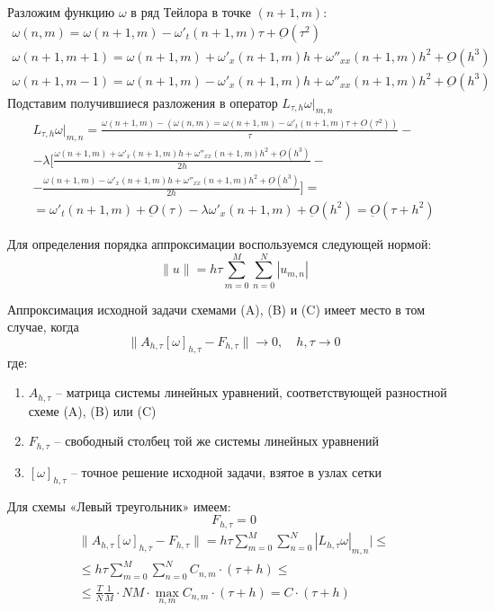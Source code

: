 \documentclass[titlepage]{article}
\def\le{\leqslant}
\begin{document}
Разложим функцию $\omega$ в ряд Тейлора в точке $(n+1,m)$:
\begin{gather*}
	\omega(n,m) = \omega(n+1,m) - \omega'_t(n+1,m)\tau + \underbar{\textit{O}}(\tau^2) \\
	\omega(n+1,m+1) = \omega(n+1,m) + \omega'_x(n+1,m)h + \omega''_{xx}(n+1,m)h^2 + \underbar{\textit{O}}(h^3) \\
	\omega(n+1,m-1) = \omega(n+1,m) - \omega'_x(n+1,m)h + \omega''_{xx}(n+1,m)h^2 + \underbar{\textit{O}}(h^3)
\end{gather*}
Подставим получившиеся разложения в оператор $L_{\tau,h}{\omega} |_{m,n}$
\begin{multline*}
	L_{\tau,h}{\omega} |_{m,n} = \frac{\omega(n+1,m) - (\omega(n,m) = \omega(n+1,m) - \omega'_t(n+1,m)\tau + \underbar{\textit{O}}(\tau^2))}{\tau} - \\
	- \lambda \biggl[ \frac{\omega(n+1,m) + \omega'_x(n+1,m)h + \omega''_{xx}(n+1,m)h^2 + \underbar{\textit{O}}(h^3)}{2h} - \\
	- \frac{\omega(n+1,m) - \omega'_x(n+1,m)h + \omega''_{xx}(n+1,m)h^2 + \underbar{\textit{O}}(h^3)}{2h} \biggr] = \\
	= \omega'_t(n+1,m) + \underbar{\textit{O}}(\tau) - \lambda\omega'_x(n+1,m) + \underbar{\textit{O}}(h^2) = \underbar{\textit{O}}(\tau + h^2)
\end{multline*}

Для определения порядка аппроксимации воспользуемся следующей нормой:
\begin{equation*}
	\|u\| = h\tau\sum_{m=0}^{M}\sum_{n=0}^{N}{|u_{m,n}|}
\end{equation*}

Аппроксимация исходной задачи схемами (A), (B) и (C) имеет место в том случае, когда 
\begin{equation*}
	\|A_{h,\tau}[\omega]_{h,\tau} - F_{h,\tau}\| \to 0, \quad h,\tau \to 0
\end{equation*}
где:
\begin{enumerate}
	\item $A_{h,\tau}$ -- матрица системы линейных уравнений, соответствующей разностной схеме (A), (B) или (C)
	\item $F_{h,\tau}$ -- свободный столбец той же системы линейных уравнений
	\item $[\omega]_{h,\tau}$ -- точное решение исходной задачи, взятое в узлах сетки
\end{enumerate}

Для схемы «Левый треугольник» имеем:
$$F_{h,\tau} = 0$$
\begin{multline*}
	\|A_{h,\tau}[\omega]_{h,\tau} - F_{h,\tau}\| = h\tau\sum_{m=0}^{M}\sum_{n=0}^{N}{|L_{h,\tau}\omega|_{m,n}|} \le \\
	\le h\tau\sum_{m=0}^{M}\sum_{n=0}^{N}{C_{n,m}\cdot(\tau+h)} \le \\
	\le \frac{T}{N}\frac{1}{M} \cdot NM \cdot \max_{n,m}{C_{n,m}} \cdot (\tau+h) = C \cdot (\tau+h)
\end{multline*}
\end{document}
